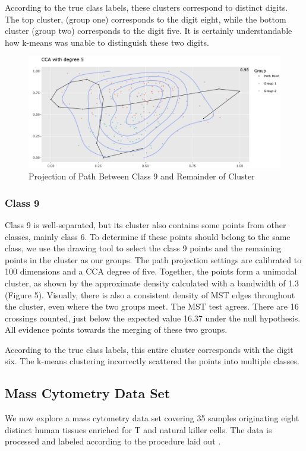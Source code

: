 \documentclass{article}
\begin{document}
According to the true class labels, these clusters correspond to distinct digits. The top cluster, (group one) corresponds to the digit eight, while the bottom cluster (group two) corresponds to the digit five. It is certainly understandable how k-means was unable to distinguish these two digits.

\renewcommand{\figurename}{Figure}
\renewcommand{\thefigure}{5}
\begin{figure}[!t]
\centering
\includegraphics[scale=0.37]{class 9 projection}
\caption{Projection of Path Between Class 9 and Remainder of Cluster}
\end{figure}

\subsubsection{Class 9}
Class 9 is well-separated, but its cluster also contains some points from other classes, mainly class 6. To determine if these points should belong to the same class, we use the drawing tool to select the class 9 points and the remaining points in the cluster as our groups. The path projection settings are calibrated to 100 dimensions and a CCA degree of five. Together, the points form a unimodal cluster, as shown by the approximate density calculated with a bandwidth of 1.3 (Figure 5). Visually, there is also a consistent density of MST edges throughout the cluster, even where the two groups meet. The MST test agrees. There are 16 crossings counted, just below the expected value 16.37 under the null hypothesis. All evidence points towards the merging of these two groups.

According to the true class labels, this entire cluster corresponds with the digit six. The k-means clustering incorrectly scattered the points into multiple classes.

\subsection{Mass Cytometry Data Set}
We now explore a mass cytometry data set \cite{Wong data set} covering 35 samples originating eight distinct human tissues enriched for T and natural killer cells. The data is processed and labeled according to the procedure laid out \cite{UMAP example}.
\end{document}
